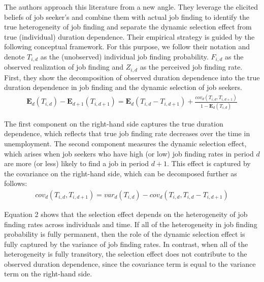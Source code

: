 \documentclass[11pt,a4paper,leqno]{article}
\begin{document}
The authors approach this literature from a new angle. They leverage the elicited beliefs of job seeker's and combine them with actual job finding to identify the true heterogeneity of job finding and separate the dynamic selection effect from true (individual) duration dependence. Their empirical strategy is guided by the following conceptual framework. For this purpose, we follow their notation and denote $T_{i,d}$ as the (unobserved) individual job finding probability. $F_{i,d}$ as the observed realization of job finding and $Z_{i,d}$ as the perceived job finding rate. First, they show the decomposition of observed duration dependence into the true duration dependence in job finding and the dynamic selection of job seekers. 
\begin{align}
	\mathbf{E}_d (T_{i,d}) - \mathbf{E}_{d+1} (T_{i,d+1}) = \mathbf{E}_d (T_{i,d} - T_{i,d+1}) + \frac{cov_d (T_{i,d},T_{i,d+1})}{1 - \mathbf{E}_d (T_{i,d})}
\end{align}

The first component on the right-hand side captures the true duration dependence, which reflects that true job finding rate decreases over the time in unemployment. 
The second component measures the dynamic selection effect, which arises when job seekers who have high (or low) job finding rates in period $d$ are more (or less) likely to find a job in period $d+1$. This effect is captured by the covariance on the right-hand side, which can be decomposed further as follows:
\begin{align}
	cov_d (T_{i,d},T_{i,d+1}) = var_d (T_{i,d}) -  cov_d (T_{i,d},T_{i,d} - T_{i,d+1})
\end{align}

Equation 2 shows that the selection effect depends on the heterogeneity of job finding rates across individuals and time. If all of the heterogeneity in job finding probability is fully permanent, then the role of the dynamic selection effect is fully captured by the variance of job finding rates. In contrast, when all of the heterogeneity is fully transitory, the selection effect does not contribute to the observed duration dependence, since the covariance term is equal to the variance term on the right-hand side.
\end{document}
